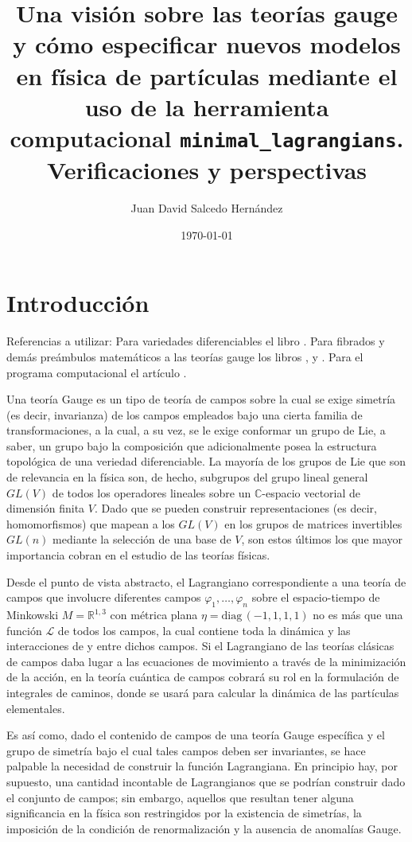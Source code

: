 \documentclass[
                egregdoesnotlikesansseriftitles,
                paper=a4,
                fontsize=13pt,
                DIV=calc]{scrarticle}
\author{Juan David Salcedo Hernández}
\date{\today}
\title{Una visión sobre las teorías gauge y cómo especificar nuevos modelos en física de partículas mediante el uso de la herramienta computacional \texttt{minimal\_lagrangians}. Verificaciones y perspectivas}
\begin{document}
\maketitle
\tableofcontents


\section{Introducción}
\label{sec:org2d0c3e2}
Referencias a utilizar:
Para variedades diferenciables el libro \autocite{ballmann2015}. Para fibrados y demás
preámbulos matemáticos a las teorías gauge los libros \autocite{hamilton2017},
\autocite{deFaria2010} y \autocite{baum2009}. Para el programa computacional el artículo
\autocite{may2021minimal}.

Una teoría Gauge es un tipo de teoría de campos sobre la cual se exige simetría
(es decir, invarianza) de los campos empleados bajo una cierta familia de
transformaciones, a la cual, a su vez, se le exige conformar un grupo de Lie, a
saber, un grupo bajo la composición que adicionalmente posea la estructura topológica
de una veriedad diferenciable. La mayoría de los grupos de Lie que son de
relevancia en la física son, de hecho, subgrupos del grupo lineal general
\(GL(V)\) de todos los operadores lineales sobre un \(\mathbb{C}\)-espacio vectorial
de dimensión finita \(V\). Dado que se pueden construir representaciones (es
decir, homomorfismos) que mapean a los \(GL(V)\) en los grupos de matrices invertibles
\(GL(n)\) mediante la selección de una base de \(V\), son estos últimos los que mayor
importancia cobran en el estudio de las teorías físicas.

Desde el punto de vista abstracto, el Lagrangiano correspondiente a una teoría
de campos que involucre diferentes campos \(\varphi_1, \ldots, \varphi_n\) sobre
el espacio-tiempo de Minkowski \(M = \mathbb{R}^{1,3}\) con métrica plana \(\eta =
\text{diag}\,(-1, 1, 1, 1)\) no es más que una función \(\mathcal{L}\) de todos
los campos, la cual contiene toda la dinámica y las interacciones de y entre dichos
campos. Si el Lagrangiano de las teorías clásicas de campos daba lugar a las
ecuaciones de movimiento a través de la minimización de la acción, en la teoría
cuántica de campos cobrará su rol en la formulación de integrales de caminos,
donde se usará para calcular la dinámica de las partículas elementales.

Es así como, dado el contenido de campos de una teoría Gauge específica y el
grupo de simetría bajo el cual tales campos deben ser invariantes, se hace
palpable la necesidad de construir la función Lagrangiana. En principio hay, por
supuesto, una cantidad incontable de Lagrangianos que se podrían construir dado
el conjunto de campos; sin embargo, aquellos que resultan tener alguna
significancia en la física son restringidos por la existencia de simetrías, la
imposición de la condición de renormalización y la ausencia de anomalías Gauge.
\end{document}
